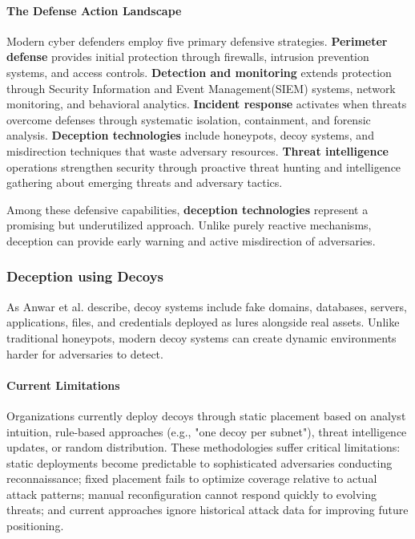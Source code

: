 \documentclass[12pt,oneside]{article}
\begin{document}
\paragraph{The Defense Action Landscape} Modern cyber defenders employ five primary defensive strategies. \textbf{Perimeter defense} provides initial protection through firewalls, intrusion prevention systems, and access controls. \textbf{Detection and monitoring} extends protection through Security Information and Event Management(SIEM) systems, network monitoring, and behavioral analytics. \textbf{Incident response} activates when threats overcome defenses through systematic isolation, containment, and forensic analysis. \textbf{Deception technologies} include honeypots, decoy systems, and misdirection techniques that waste adversary resources. \textbf{Threat intelligence} operations strengthen security through proactive threat hunting and intelligence gathering about emerging threats and adversary tactics.


Among these defensive capabilities, \textbf{deception technologies} represent a promising but underutilized approach. Unlike purely reactive mechanisms, deception can provide early warning and active misdirection of adversaries.

\clearpage

\subsubsection{Deception using Decoys} 

As Anwar et al. \cite{anwar2022honeypot} describe, decoy systems include fake domains, databases, servers, applications, files, and credentials deployed as lures alongside real assets. Unlike traditional honeypots, modern decoy systems can create dynamic environments harder for adversaries to detect.

\paragraph{Current Limitations} Organizations currently deploy decoys through static placement based on analyst intuition, rule-based approaches (e.g., "one decoy per subnet"), threat intelligence updates, or random distribution. These methodologies suffer critical limitations: static deployments become predictable to sophisticated adversaries conducting reconnaissance; fixed placement fails to optimize coverage relative to actual attack patterns; manual reconfiguration cannot respond quickly to evolving threats; and current approaches ignore historical attack data for improving future positioning.
\end{document}
